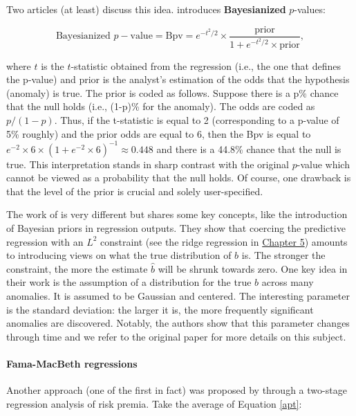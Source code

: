 Two articles (at least) discuss this idea. \cite{harvey2017presidential} introduces \textbf{Bayesianized} $p$-values:

\begin{equation}
\label{bayes_pvalue}
\text{Bayesianized } p-\text{value}=\text{Bpv}= e^{-t^2/2}\times\frac{\text{prior}}{1+e^{-t^2/2}\times \text{prior}},
\end{equation}

where $t$ is the $t$-statistic obtained from the regression (i.e., the one that defines the p-value) and prior is the analyst's estimation of the odds that the hypothesis (anomaly) is true. The prior is coded as follows. Suppose there is a p\% chance that the null holds (i.e., (1-p)\% for the anomaly). The odds are coded as $p/(1 -p)$. Thus, if the t-statistic is equal to 2 (corresponding to a p-value of 5\% roughly) and the prior odds are equal to 6, then the Bpv is equal to $e^{ -2}\times 6 \times(1+e^{ -2}\times 6)^{ -1}\approx 0.448$ and there is a 44.8\% chance that the null is true. This interpretation stands in sharp contrast with the original $p$-value which cannot be viewed as a probability that the null holds. Of course, one drawback is that the level of the prior is crucial and solely user-specified.

The work of \cite{chinco2019estimating} is very different but shares some key concepts, like the introduction of Bayesian priors in regression outputs. They show that coercing the predictive regression with an $L^2$ constraint (see the ridge regression in \href{/chap-06-lasso}{Chapter 5}) amounts to introducing views on what the true distribution of $b$ is. The stronger the constraint, the more the estimate $\hat{b}$ will be shrunk towards zero. One key idea in their work is the assumption of a distribution for the true $b$ across many anomalies. It is assumed to be Gaussian and centered. The interesting parameter is the standard deviation: the larger it is, the more frequently significant anomalies are discovered. Notably, the authors show that this parameter changes through time and we refer to the original paper for more details on this subject.

\paragraph{Fama-MacBeth regressions}

Another approach (one of the first in fact) was proposed by \cite{fama1973risk} through a two-stage regression analysis of risk premia. Take the average of Equation \ref{apt}:

